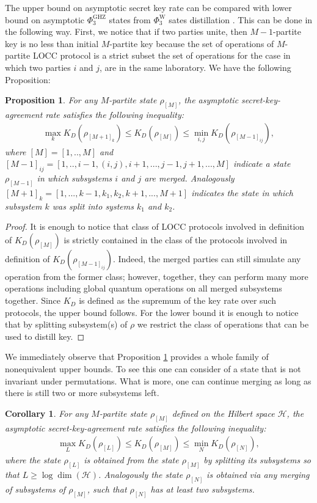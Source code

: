 \documentclass[aps,pra,twocolumn,superscriptaddress,longbibliography]{revtex4-1}
\newtheorem{corollary}{Corollary}
\newtheorem{proposition}{Proposition}
\begin{document}
The upper bound on asymptotic secret key rate can be compared with lower bound on asymptotic $\Phi_{3}^\mathrm{GHZ}$ states from $\Phi_{3}^\mathrm{W}$ sates distillation \cite{SVW}. This can be done in the following way. First, we notice that if two parties unite, then $M-1$-partite key is no less than initial $M$-partite key because the set of operations of $M$-partite LOCC protocol is a strict subset the set of operations for the case in which two parties $i$ and $j$, are in the same laboratory. We have the following Proposition:
\begin{proposition}\label{prop:statesmerging} For any $M$-partite state $\rho_{[M]}$, the asymptotic secret-key-agreement rate satisfies the following inequality:
\begin{align}
    \max_{k}K_D(\rho_{[M+1]_{k}})\leq K_D(\rho_{[M]}) \le \min_{i,j} K_D(\rho_{[M-1]_{ij}}), 
\end{align}
where $[M]=[1,..,M]$ and $[M-1]_{ij}=[1,..,i-1,(i,j),i+1,...,j-1,j+1,...,M]$ indicate a state $\rho_{[M-1]}$ in which subsystems $i$ and $j$ are merged. Analogously $[M+1]_{k}=
[1,...,k-1,k_1,k_2,k+1,...,M+1]$
indicates the state in which
subsystem $k$ was split into systems $k_1$ and $k_2$.
\end{proposition}
\begin{proof}
It is enough to notice that class of LOCC protocols involved in definition of $K_D(\rho_{[M]})$ is strictly contained in the class of the protocols involved in definition of $K_D(\rho_{[M-1]_{ij}})$. Indeed, the merged parties can still simulate any operation from the former class; however, together, they can perform many more operations including global quantum operations on all merged subsystems together. Since $K_D$ is defined as the supremum of the key rate over such protocols, the upper bound follows. For the
lower bound it is enough to 
notice that by splitting subsystem(s) of $\rho$ we restrict
the class of operations that
can be used to distill key.
\end{proof}
We immediately observe that Proposition \ref{prop:statesmerging} provides a whole family of nonequivalent upper bounds. To see this one can consider of a state that is not invariant under permutations. What is more, one can continue merging as long as there is still two or more subsystems left.
\begin{corollary}\label{cor:dist-state}
For any $M$-partite state  $\rho_{[M]}$ defined on the Hilbert space ${\mathcal H}$, the asymptotic secret-key-agreement rate satisfies the following inequality:
\begin{align}
    \max_L K_D(\rho_{[L]})\leq K_D(\rho_{[M]}) \leq \min_{N} K_D(\rho_{[N]}),
\end{align}
where the state $\rho_{[L]}$ is 
obtained from the state $\rho_{[M]}$ by splitting its subsystems so that $L\geq \log \dim({\mathcal H})$.
Analogously the state $\rho_{[N]}$ is obtained via any merging of subsystems of $\rho_{[M]}$, such that $\rho_{[N]}$ has at least two subsystems.
\end{corollary}
\end{document}
